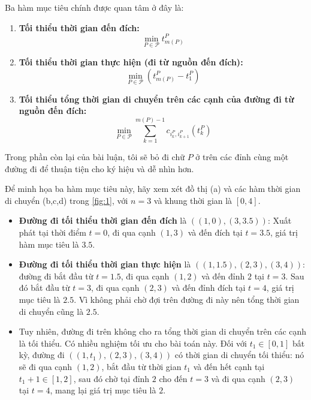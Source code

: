 \documentclass[../main.tex]{subfiles}
\begin{document}
Ba hàm mục tiêu chính được quan tâm ở đây là:

\begin{enumerate}
\def\labelenumi{\arabic{enumi}.}
\tightlist
\item
  \textbf{Tối thiểu thời gian đến đích:}
  \[\min_{P\in \mathcal P}t_{m(P)}^P\]
\item
  \textbf{Tối thiểu thời gian thực hiện (đi từ nguồn đến đích):}
  \[\min_{P\in \mathcal P}(t_{m(P)}^P-t_1^P)\]
\item
  \textbf{Tối thiểu tổng thời gian di chuyển trên các cạnh của đường đi
  từ nguồn đến đích:}
  \[\min_{P\in \mathcal P}\sum_{k=1}^{m(P)-1}c_{i_k^P, i_{k+1}^P}(t_k^P)\]
\end{enumerate}

Trong phần còn lại của bài luận, tôi sẽ bỏ đi chữ \(P\) ở trên các đỉnh cùng một đường đi để thuận tiện cho ký hiệu và dễ nhìn
hơn.

Để minh họa ba hàm mục tiêu này, hãy xem xét đồ thị (a) và các hàm thời
gian di chuyển (b,c,d) trong \autoref{fig:1}, với \(n = 3\) và khung thời gian
là \([0, 4]\).

\begin{itemize}
\tightlist
\item
  \textbf{Đường đi tối thiểu thời gian đến đích} là
  \(((1, 0), (3, 3.5))\): Xuất phát tại thời điểm \(t = 0\), đi qua cạnh
  \((1, 3)\) và đến đích tại \(t = 3.5\), giá trị hàm mục tiêu là
  \(3.5\).
\item
  \textbf{Đường đi tối thiểu thời gian thực hiện} là
  \(((1, 1.5), (2, 3), (3, 4))\): đường đi bắt đầu từ \(t = 1.5\), đi
  qua cạnh \((1, 2)\) và đến đỉnh \(2\) tại \(t = 3\). Sau đó bắt đầu từ
  \(t = 3\), đi qua cạnh \((2, 3)\) và đến đỉnh đích tại \(t = 4\), giá
  trị mục tiêu là \(2.5\). Vì không phải chờ đợi trên đường đi này nên
  tổng thời gian di chuyển cũng là \(2.5\).
\item
  Tuy nhiên, đường đi trên không cho ra tổng thời gian di chuyển trên
  các cạnh là tối thiểu. Có nhiều nghiệm tối ưu cho bài toán này. Đối
  với \(t_1 \in [0, 1]\) bất kỳ, đường đi \(((1, t_1), (2, 3), (3, 4))\)
  có thời gian di chuyển tối thiểu: nó sẽ đi qua cạnh \((1, 2)\), bắt
  đầu từ thời gian \(t_1\) và đến hết cạnh tại \(t_1 + 1 \in [1, 2]\),
  sau đó chờ tại đỉnh \(2\) cho đến \(t = 3\) và đi qua cạnh \((2, 3)\)
  tại \(t = 4\), mang lại giá trị mục tiêu là \(2\).
\end{itemize}
\end{document}
